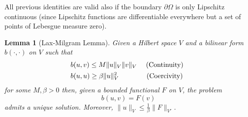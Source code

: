 \documentclass{article}
\newtheorem{thm}{Theorem}[section]
\newtheorem{lemma}[thm]{Lemma}
\begin{document}

All previous identities are valid also if the boundary $\partial\Omega$ is only Lipschitz continuous (since Lipschitz functions are differentiable everywhere but a set of points of Lebesgue measure zero).


\begin{lemma}[Lax-Milgram Lemma]\label{lemma:lax_mil}
    Given a Hilbert space $V$ and a bilinear form $b(\cdot, \cdot)$ on $V$ such that
    \begin{align*}
        & b(u,v) \leq M \| u\|_V \| v\|_V \quad \text{ (Continuity) }\\
        &b(u,u) \geq \beta \| u\|_V^2 \qquad \hspace{6mm} \text{ (Coercivity) }
    \end{align*}
    for some $M,\beta>0$ then, given a bounded functional $F$ on $V$, the problem
    \begin{equation*}
        b(u,v) = F(v)
    \end{equation*}
    admits a unique solution. Moreover, $\| u\|_V \leq \frac{1}{\beta} \| F\|_{V'}$.
\end{lemma}

    
\end{document}
